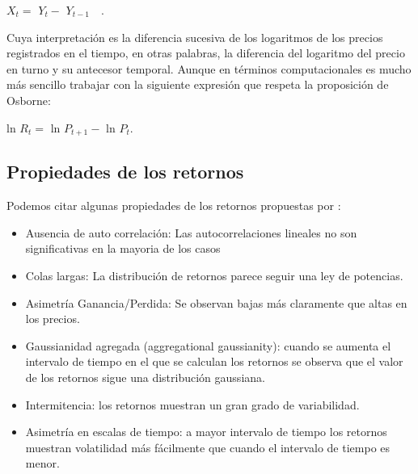 \begin{center}
$X_t = $ $\mathit{Y_{t}} - $  $\mathit{Y_{t - 1}}$~~.
\end{center}

Cuya interpretación es la diferencia sucesiva de los logaritmos de los precios  registrados en el tiempo, en otras palabras, la diferencia del logaritmo del precio en turno y su antecesor temporal. Aunque en términos computacionales es mucho más sencillo trabajar con la siguiente expresión que respeta la proposición de Osborne\citep[][]{slanina}: 
\begin{center}
ln $R_t = $ ln $\mathit{P_{t+1}} - $ ln $\mathit{P_{t}}$.
\end{center}%


\subsection{Propiedades de los retornos}
\label{retornos}
Podemos citar algunas propiedades de los retornos propuestas por \cite{Cont2001}:

\begin{itemize}
	\item {Ausencia de auto correlación: Las autocorrelaciones lineales no son significativas en la mayoria de los casos}
	\item {Colas largas: La distribución de retornos parece seguir una ley de potencias.}
	\item Asimetría Ganancia/Perdida: Se observan bajas más claramente que altas en los precios. 
	\item Gaussianidad agregada (aggregational gaussianity): cuando se aumenta el intervalo de tiempo en el que se calculan los retornos se observa que el valor de los retornos sigue una distribución gaussiana. 
	\item Intermitencia: los retornos muestran un gran grado de variabilidad.
	\item Asimetría en escalas de tiempo: a mayor intervalo de tiempo los retornos muestran volatilidad más fácilmente que cuando el intervalo de tiempo es menor.
\end{itemize}

